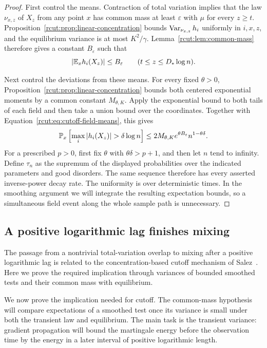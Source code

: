 \begin{proof}
First control the means.  Contraction of total variation implies that
the law $\nu_{x,z}$ of $X_z$ from any point $x$ has common mass at least
$\varepsilon$ with $\mu$ for every $z\ge t$.
Proposition~\ref{rcut:prop:linear-concentration} bounds
$\operatorname{Var}_{\nu_{x,z}}h_i$ uniformly in $i,x,z$, and the equilibrium
variance is at most $K^2/\gamma$.  Lemma~\ref{rcut:lem:common-mass} therefore
gives a constant $B_\varepsilon$ such that
\begin{equation}
 |\mathbb E_x h_i(X_z)|\le B_\varepsilon
 \qquad(t\le z\le D_*\log n).
 \label{rcut:eq:cutoff-field-means}
\end{equation}

Next control the deviations from these means.  For every fixed
$\theta>0$, Proposition~\ref{rcut:prop:linear-concentration} bounds both
centered exponential moments by a common constant $M_{\theta,K}$.
Apply the exponential bound to both tails of each field and then take
a union bound over the coordinates.  Together with
Equation~\eqref{rcut:eq:cutoff-field-means}, this gives
\begin{equation}
 \P_x\left[\max_i|h_i(X_z)|>\delta\log n\right]
 \le 2M_{\theta,K}e^{\theta B_\varepsilon}
             n^{1-\theta\delta}.
 \label{rcut:eq:cutoff-field-chernoff}
\end{equation}
For a prescribed $p>0$, first fix $\theta$ with
$\theta\delta>p+1$, and then let $n$ tend to infinity.  Define
$\tau_n$ as the supremum of the displayed probabilities over the
indicated parameters and good disorders.  The same sequence therefore
has every asserted inverse-power decay rate.  The uniformity is over
deterministic times.  In the smoothing argument we will integrate the
resulting expectation bounds, so a simultaneous field event along the
whole sample path is unnecessary.
\end{proof}

\subsection{A positive logarithmic lag finishes mixing}

The passage from a nontrivial total-variation overlap to mixing after a
positive logarithmic lag is related to the concentration-based cutoff
mechanism of Salez~\cite[Theorem~5 and Lemma~9]{Salez2024}.  Here we
prove the required implication through variances of bounded smoothed
tests and their common mass with equilibrium.

We now prove the implication needed for cutoff.  The common-mass
hypothesis will compare expectations of a smoothed test once its
variance is small under both the transient law and equilibrium.
The main task is the transient variance: gradient propagation will
bound the martingale energy before the observation time by the energy
in a later interval of positive logarithmic length.

